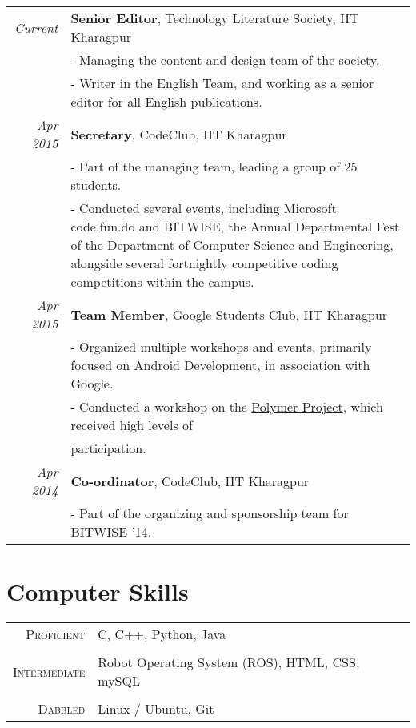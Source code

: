 \documentclass[a4paper,10pt]{article} %
\begin{document}
\begin{tabular}{rp{11cm}}
\emph{Current} & \textbf{Senior Editor}, Technology Literature Society, IIT Kharagpur \\
& \footnotesize{- Managing the content and design team of the society.}\\
& \footnotesize{- Writer in the English Team, and working as a senior editor for all English publications.}\\
\emph{Apr 2015} & \textbf{Secretary}, CodeClub, IIT Kharagpur \\
& \footnotesize{- Part of the managing team, leading a group of 25 students.}\\
& \footnotesize{- Conducted several events, including Microsoft code.fun.do and BITWISE, the Annual Departmental Fest of the Department of Computer Science and Engineering, alongside several fortnightly competitive coding competitions within the campus.}\\
\emph{Apr 2015} & \textbf{Team Member}, Google Students Club, IIT Kharagpur \\
& \footnotesize{- Organized multiple workshops and events, primarily focused on Android Development, in association with Google.}\\
& \footnotesize{- Conducted a workshop on the {\href{https://www.polymer-project.org/0.5/}{Polymer Project}}, which received high levels of}\\ & \footnotesize{participation.}\\
\emph{Apr 2014} & \textbf{Co-ordinator}, CodeClub, IIT Kharagpur \\
& \footnotesize{- Part of the organizing and sponsorship team for BITWISE '14.}\\
\end{tabular}


\section{Computer Skills}

\begin{tabular}{r|p{11cm}}
\textsc{Proficient} & C, C++, Python, Java\\
\multicolumn{2}{c}{} \\
\textsc{Intermediate} &  Robot Operating System (ROS), HTML, CSS, mySQL\\
\multicolumn{2}{c}{} \\
\textsc{Dabbled} & Linux / Ubuntu, Git\\
\end{tabular}
\end{document}
